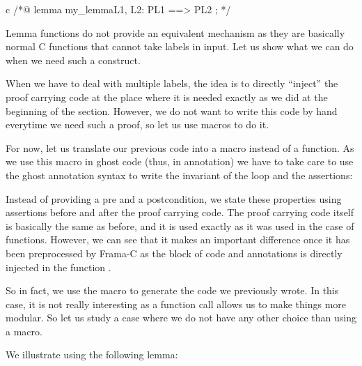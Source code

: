 \begin{CodeBlock}{c}
/*@
  lemma my_lemma{L1, L2}:  P{L1} ==> P{L2} ;
*/
\end{CodeBlock}



Lemma functions do not provide an equivalent mechanism as they are basically
normal C functions that cannot take labels in input. Let us show what we can
do when we need such a construct.






When we have to deal with multiple labels, the idea is to directly ``inject''
the proof carrying code at the place where it is needed exactly as we did at the
beginning of the section. However, we do not want to write this code by hand
everytime we need such a proof, so let us use macros to do it.



For now, let us translate our previous code into a macro instead of a function.
As we use this macro in ghost code (thus, in annotation) we have to take care to
use the ghost annotation syntax to write the invariant of the loop and the
assertions:






Instead of providing a pre and a postcondition, we state these properties using
assertions before and after the proof carrying code. The proof carrying code
itself is basically the same as before, and it is used exactly as it was used in
the case of functions. However, we can see that it makes an important difference
once it has been preprocessed by Frama-C as the block of code and annotations is
directly injected in the function .






So in fact, we use the macro to generate the code we previously wrote. In this
case, it is not really interesting as a function call allows us to make things
more modular. So let us study a case where we do not have any other choice than
using a macro.



We illustrate using the following lemma:






